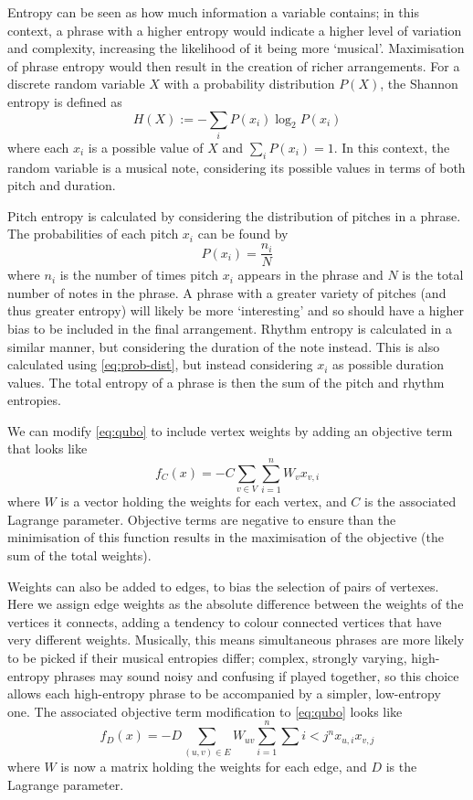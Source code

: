 \documentclass[12pt]{article}
\theoremstyle{definition}
\begin{document}
Entropy can be seen as how much information a variable contains; in this context, a phrase with a higher entropy would indicate a higher level of variation and complexity, increasing the likelihood of it being more `musical'. Maximisation of phrase entropy would then result in the creation of richer arrangements. For a discrete random variable $X$ with a probability distribution $P(X)$, the Shannon entropy is defined as
\begin{equation}
    H(X):=-\sum_i P(x_i)\log_2 P(x_i)
    \label{eq:entropy}
\end{equation}
where each $x_i$ is a possible value of $X$ and ${\sum_i P(x_i)=1}$. In this context, the random variable is a musical note, considering its possible values in terms of both pitch and duration.

Pitch entropy is calculated by considering the distribution of pitches in a phrase. The probabilities of each pitch $x_i$ can be found by
\begin{equation}
    P(x_i)=\frac{n_i}{N}
    \label{eq:prob-dist}
\end{equation}
where $n_i$ is the number of times pitch $x_i$ appears in the phrase and $N$ is the total number of notes in the phrase. A phrase with a greater variety of pitches (and thus greater entropy) will likely be more `interesting' and so should have a higher bias to be included in the final arrangement.
Rhythm entropy is calculated in a similar manner, but considering the duration of the note instead. This is also calculated using \cref{eq:prob-dist}, but instead considering $x_i$ as possible duration values.
The total entropy of a phrase is then the sum of the pitch and rhythm entropies.

We can modify \cref{eq:qubo} to include vertex weights by adding an objective term that looks like
\begin{equation}
    f_C(x)=-C\sum_{v\in V}\sum_{i=1}^n W_v x_{v,i}
\end{equation}
where $W$ is a vector holding the weights for each vertex, and $C$ is the associated Lagrange parameter. Objective terms are negative to ensure than the minimisation of this function results in the maximisation of the objective (the sum of the total weights).

Weights can also be added to edges, to bias the selection of pairs of vertexes. Here we assign edge weights as the absolute difference between the weights of the vertices it connects, adding a tendency to colour connected vertices that have very different weights. Musically, this means simultaneous phrases are more likely to be picked if their musical entropies differ; complex, strongly varying, high-entropy phrases may sound noisy and confusing if played together, so this choice allows each high-entropy phrase to be accompanied by a simpler, low-entropy one. The associated objective term modification to \cref{eq:qubo} looks like
\begin{equation}
    f_D(x)=-D\sum_{(u,v)\in E}W_{uv}\sum_{i=1}^n\sum{i<j}^n x_{u,i}x_{v,j}
\end{equation}
where $W$ is now a matrix holding the weights for each edge, and $D$ is the Lagrange parameter.
\end{document}
